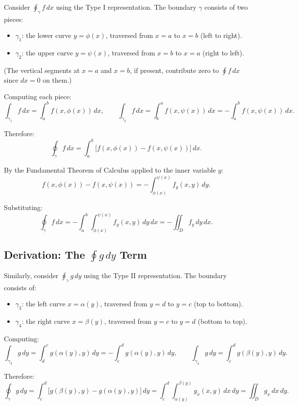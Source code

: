 \documentclass[11pt]{report}
\begin{document}
Consider $\oint_\gamma f \, dx$ using the Type I representation. The boundary $\gamma$ consists of two pieces:
\begin{itemize}
    \item $\gamma_1$: the lower curve $y = \phi(x)$, traversed from $x = a$ to $x = b$ (left to right).
    \item $\gamma_2$: the upper curve $y = \psi(x)$, traversed from $x = b$ to $x = a$ (right to left).
\end{itemize}

(The vertical segments at $x = a$ and $x = b$, if present, contribute zero to $\oint f \, dx$ since $dx = 0$ on them.)

Computing each piece:
\[
\int_{\gamma_1} f \, dx = \int_a^b f(x, \phi(x)) \, dx, \qquad \int_{\gamma_2} f \, dx = \int_b^a f(x, \psi(x)) \, dx = -\int_a^b f(x, \psi(x)) \, dx.
\]

Therefore:
\[
\oint_\gamma f \, dx = \int_a^b \big[ f(x, \phi(x)) - f(x, \psi(x)) \big] \, dx.
\]

By the Fundamental Theorem of Calculus applied to the inner variable $y$:
\[
f(x, \phi(x)) - f(x, \psi(x)) = -\int_{\phi(x)}^{\psi(x)} f_y(x, y) \, dy.
\]

Substituting:
\[
\oint_\gamma f \, dx = -\int_a^b \int_{\phi(x)}^{\psi(x)} f_y(x, y) \, dy \, dx = -\iint_D f_y \, dy \, dx.
\]

\subsection*{Derivation: The $\oint g \, dy$ Term}

Similarly, consider $\oint_\gamma g \, dy$ using the Type II representation. The boundary consists of:
\begin{itemize}
    \item $\gamma_3$: the left curve $x = \alpha(y)$, traversed from $y = d$ to $y = c$ (top to bottom).
    \item $\gamma_4$: the right curve $x = \beta(y)$, traversed from $y = c$ to $y = d$ (bottom to top).
\end{itemize}

Computing:
\[
\int_{\gamma_3} g \, dy = \int_d^c g(\alpha(y), y) \, dy = -\int_c^d g(\alpha(y), y) \, dy, \qquad \int_{\gamma_4} g \, dy = \int_c^d g(\beta(y), y) \, dy.
\]

Therefore:
\[
\oint_\gamma g \, dy = \int_c^d \big[ g(\beta(y), y) - g(\alpha(y), y) \big] \, dy = \int_c^d \int_{\alpha(y)}^{\beta(y)} g_x(x, y) \, dx \, dy = \iint_D g_x \, dx \, dy.
\]
\end{document}
